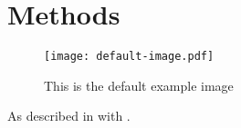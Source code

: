 \usepackage{prettyref}

\section{Methods}
\label{sec:methods}

\begin{figure}
	\centering\texttt{[image: default-image.pdf]}
	\caption{This is the default example image}
	\label{fig:my-figure}
\end{figure}

As described in  with .
